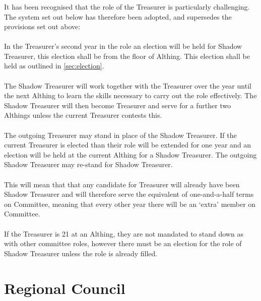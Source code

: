 \documentclass[a4paper, 12pt]{article}
\begin{document}
\subsubsection{}
It has been recognised that the role of the Treasurer is particularly challenging. The system set out below has therefore been adopted, and supersedes the provisions set out above:
\paragraph{}
In the Treasurer's second year in the role an election will be held for Shadow Treasurer, this election shall be from the floor of Althing. This election shall be held as outlined in \ref{sec:election}.
\paragraph{}
The Shadow Treasurer will work together with the Treasurer over the year until the next Althing to learn the skills necessary to carry out the role effectively. The Shadow Treasurer will then become Treasurer and serve for a further two Althings unless the current Treasurer contests this.
\paragraph{}
The outgoing Treasurer may stand in place of the Shadow Treasurer. If the current Treasurer is elected than their role will be extended for one year and an election will be held at the current Althing for a Shadow Treasurer. The outgoing Shadow Treasurer may re-stand for Shadow Treasurer.
\paragraph{}
This will mean that that any candidate for Treasurer will already have been Shadow Treasurer and will therefore serve the equivalent of one-and-a-half terms on Committee, meaning that every other year there will be an `extra' member on Committee.
\paragraph{}
\label{sec:treasurergreyarea}
If the Treasurer is 21 at an Althing, they are not mandated to stand down as with other committee roles, however there must be an election for the role of Shadow Treasurer unless the role is already filled.

\section{Regional Council}
\end{document}
